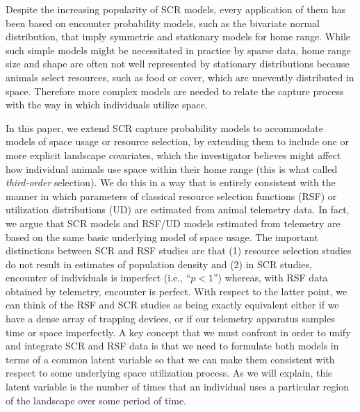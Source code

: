 \documentclass[12pt]{article}
\begin{document}
Despite the increasing popularity of SCR models, every
application of them has been based on encounter probability
models, such as the bivariate normal distribution, that imply
symmetric and stationary models for home range.
While such simple models might be necessitated in practice
by sparse data, %
home range size and shape are often not well represented by stationary
distributions because animals select resources, such as food or cover,
which are unevently distributed in space. Therefore %
more complex models are needed to relate the capture  %
process with the way in which individuals utilize space. %

In this paper,
we extend SCR capture 
probability models to
accommodate models of space usage or resource selection, by extending
them to include one or more explicit landscape covariates, which the
investigator believes might affect how individual animals use space
within their home range (this is what \citep{johnson:1980} called {\it
  third-order} selection). We do this in a way that is entirely
consistent with the manner in which parameters of classical resource selection
functions (RSF) \citep{manly_etal:2002} or utilization
distributions (UD) \citep{worton:1989, fieberg:2005, fieberg:2007} are
estimated from animal telemetry data.  In fact, we argue that SCR
models and RSF/UD models estimated from telemetry are based on the
same basic underlying model of space usage. The important distinctions
between SCR and RSF studies are that (1) resource selection studies do
not result in estimates of population density and (2) in SCR studies, encounter of
individuals is imperfect (i.e., ``$p<1$'') whereas, with RSF data
obtained by telemetry, encounter is perfect.  With respect to the
latter point, we can think of the RSF and SCR studies
as being exactly equivalent either if we have a dense array of
trapping devices, or if our telemetry apparatus %
samples time or space imperfectly.
A key concept that we must confront in order to unify and integrate SCR
and RSF data is that we need to formulate both models in terms of a
common latent variable so that we can make them consistent with
respect to some underlying space utilization process. As we will
explain, this latent variable is the number of times that an
individual uses a particular region %
of the landscape over some period of time.
\end{document}
